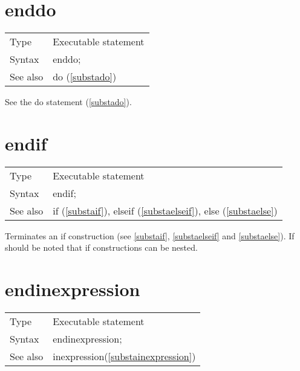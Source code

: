 
\section{enddo}
\label{substaenddo}

\noindent \begin{tabular}{ll}
Type & Executable statement\\
Syntax & enddo;
\\ See also & do (\ref{substado})
\end{tabular} \vspace{4mm}

See the do statement (\ref{substado}).
\vspace{10mm}


\section{endif}
\label{substaendif}

\noindent \begin{tabular}{ll}
Type & Executable statement\\
Syntax & endif;
\\ See also & if (\ref{substaif}),
              elseif (\ref{substaelseif}),
              else (\ref{substaelse})
\end{tabular} \vspace{4mm}

\noindent Terminates an if construction (see \ref{substaif}, 
\ref{substaelseif} and \ref{substaelse}). If should be noted that 
if 
constructions can be nested.
\vspace{10mm}

 
\section{endinexpression}
\label{substaendinexpression}

\noindent \begin{tabular}{ll}
Type & Executable statement\\
Syntax & endinexpression;
\\ See also & inexpression(\ref{substainexpression})
\end{tabular} \vspace{4mm}

